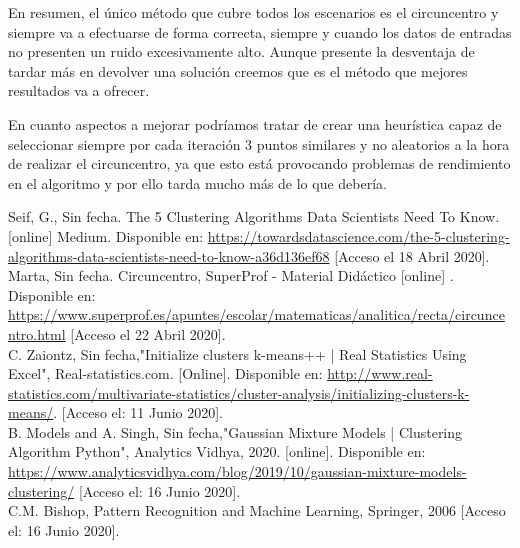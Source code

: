 \documentclass[conference,a4paper]{IEEEtran}
\begin{document}
\newpage
En resumen, el único método que cubre todos los escenarios es el circuncentro y siempre va a efectuarse de forma correcta, siempre y cuando los datos de entradas no presenten un ruido excesivamente alto. Aunque presente la desventaja de tardar más en devolver una solución creemos que es el método que mejores resultados va a ofrecer.

En cuanto aspectos a mejorar podríamos tratar de crear una heurística capaz de seleccionar siempre por cada iteración 3 puntos similares y no aleatorios a la hora de realizar el circuncentro, ya que esto está provocando problemas de rendimiento en el algoritmo y por ello tarda mucho más de lo que debería.



\clearpage
\begin{thebibliography}{9}
	
	\label{bib:georgeSeif}
	Seif, G., Sin fecha. The 5 Clustering Algorithms Data Scientists Need To Know. [online] Medium. 
	Disponible en: \href{https://towardsdatascience.com/the-5-clustering-algorithms-data-scientists-need-to-know-a36d136ef68}{https://towardsdatascience.com/the-5-clustering-algorithms-data-scientists-need-to-know-a36d136ef68}
	[Acceso el 18 Abril 2020].\\

	\label{bib:circuncentro}
	Marta, Sin fecha. Circuncentro, SuperProf - Material Didáctico [online] . 
	Disponible en: \href{https://www.superprof.es/apuntes/escolar/matematicas/analitica/recta/circuncentro.html}{https://www.superprof.es/apuntes/escolar/matematicas/analitica/recta/circuncentro.html}
	[Acceso el 22 Abril 2020].\\
	

	\label{bib:clustering}
	C. Zaiontz, Sin fecha,"Initialize clusters k-means++ | Real Statistics Using Excel", Real-statistics.com. [Online]. Disponible en:  \href{http://www.real-statistics.com/multivariate-statistics/cluster-analysis/initializing-clusters-k-means/}{http://www.real-statistics.com/multivariate-statistics/cluster-analysis/initializing-clusters-k-means/}. [Acceso el: 11 Junio 2020].\\

	\label{bib:EM-GMM1}
	B. Models and A. Singh, Sin fecha,"Gaussian Mixture Models | Clustering Algorithm Python", Analytics Vidhya, 2020. [online]. 
	Disponible en: \href{https://www.analyticsvidhya.com/blog/2019/10/gaussian-mixture-models-clustering/}{https://www.analyticsvidhya.com/blog/2019/10/gaussian-mixture-models-clustering/}
	[Acceso el: 16 Junio 2020].\\

	\label{bib:EM-GMM2}
	C.M. Bishop, Pattern Recognition and Machine Learning, Springer, 2006
	[Acceso el: 16 Junio 2020].

\end{thebibliography}
\end{document}
